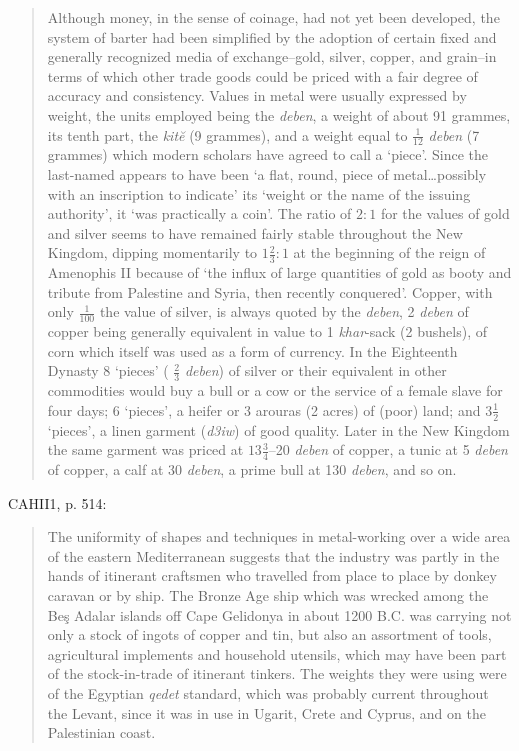 \documentclass{article}
\begin{document}
\begin{quote}
Although money, in the sense of coinage, had not yet been 
developed, the system of barter had been simplified by the adoption of certain fixed and generally recognized media of exchange--gold, silver, copper, and grain--in terms of which
other trade goods could be priced with a fair degree of accuracy 
and consistency. Values in metal were usually expressed by weight, the units employed being the {\em deben}, a weight of about 91 grammes, its tenth part, the {\em kit\u{e}} (9 grammes), and a weight equal to $\frac{1}{12}$ {\em deben} (7 grammes) which modern scholars have
agreed to call a `piece'.
Since the last-named appears to have
been `a flat, round, piece of metal\dots possibly with an inscription to indicate' its `weight or the name of the issuing authority', it `was
practically a coin'. The ratio of $2:1$ for the values of gold and
silver seems to have remained fairly stable throughout the New Kingdom, dipping momentarily to $1\frac{2}{3}:1$ at the beginning of the reign of Amenophis II because of `the influx of large quantities of
gold as booty and tribute from Palestine and Syria, then recently
conquered'. Copper, with only $\frac{1}{100}$ the value of silver, is always quoted by the {\em deben}, 2 {\em deben} of copper being generally equivalent in value to 1 {\em khar}-sack (2 bushels), of corn which itself was used
as a form of currency. In the Eighteenth Dynasty 8 `pieces'
( $\frac{2}{3}$ {\em deben}) of silver or their equivalent in other commodities would
buy a bull or a cow or the service of a female slave for four days;
6 `pieces', a heifer or 3 arouras (2 acres) of (poor) land; and
$3\frac{1}{2}$ `pieces', a linen garment ({\em d3iw}) of good quality. Later in the
New Kingdom the same garment was priced at $13\frac{3}{4}$--20 {\em deben} of copper, a tunic at 5 {\em deben} of copper,
a calf at 30 {\em deben}, a prime
bull at 130 {\em deben}, and so on.
\end{quote}

CAHII1, p. 514:

\begin{quote}
The uniformity of shapes and techniques in metal-working
over a wide area of the eastern Mediterranean suggests that the industry was partly in the hands of itinerant craftsmen who travelled from place to place by donkey caravan or by ship. The
Bronze Age ship which was wrecked among the Be\c{s} Adalar islands 
off Cape Gelidonya in about 1200 B.C. was carrying not only a stock of ingots of copper and tin, but also an assortment of tools, agricultural implements and household utensils, which may have
been part of the stock-in-trade of itinerant tinkers.
The weights 
they were using were of the Egyptian {\em qedet} standard, which was
probably current throughout the Levant, since it was in use in
Ugarit, Crete and Cyprus, and on the Palestinian coast.
\end{quote}
\end{document}
